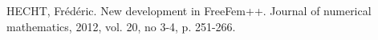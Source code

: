\documentclass[12pt,twoside,a4paper]{article}
\begin{document}

\tableofcontents

\newpage


	






\nocite{*}



 
HECHT, Frédéric. New development in FreeFem++. Journal of numerical mathematics, 2012, vol. 20, no 3-4, p. 251-266.
\end{document}
